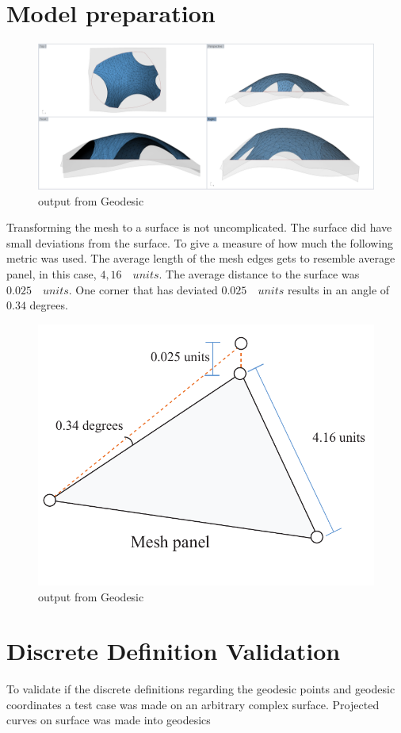 \section{Model preparation}



\begin{figure}[H]
\centering
\includegraphics[width=1.0\linewidth ]{figure/Results/surfaMesh.png}
\caption{output from Geodesic}
\end{figure}

Transforming the mesh to a surface is not uncomplicated. The surface did have small deviations from the surface. To give a measure of how much the following metric was used. The average length of the mesh edges gets to resemble average panel, in this case, $4,16 \quad units$. The average distance to the surface was $0.025 \quad units$. One corner that has deviated $0.025 \quad units$ results in an angle of  $0.34$ degrees.

\begin{figure}[H]
\centering
\includegraphics[width=0.7\linewidth ]{figure/Results/devianceSurf.pdf}
\caption{output from Geodesic}
\end{figure}


\section{Discrete Definition Validation}
To validate if the discrete definitions regarding the geodesic points and geodesic coordinates a test case was made on an arbitrary complex surface. Projected curves on surface was made into geodesics  


